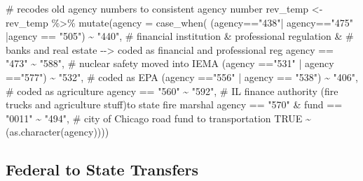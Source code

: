\documentclass[
  letterpaper,
  DIV=11,
  numbers=noendperiod]{scrreport}
\newenvironment{Shaded}{\begin{snugshade}}{\end{snugshade}}
\newcommand{\AttributeTok}[1]{\textcolor[rgb]{0.40,0.45,0.13}{#1}}
\newcommand{\CommentTok}[1]{\textcolor[rgb]{0.37,0.37,0.37}{#1}}
\newcommand{\ConstantTok}[1]{\textcolor[rgb]{0.56,0.35,0.01}{#1}}
\newcommand{\FunctionTok}[1]{\textcolor[rgb]{0.28,0.35,0.67}{#1}}
\newcommand{\NormalTok}[1]{\textcolor[rgb]{0.00,0.23,0.31}{#1}}
\newcommand{\OtherTok}[1]{\textcolor[rgb]{0.00,0.23,0.31}{#1}}
\newcommand{\SpecialCharTok}[1]{\textcolor[rgb]{0.37,0.37,0.37}{#1}}
\newcommand{\StringTok}[1]{\textcolor[rgb]{0.13,0.47,0.30}{#1}}
\begin{document}
\begin{Shaded}
\begin{Highlighting}[]
\CommentTok{\# recodes old agency numbers to consistent agency number}
\NormalTok{rev\_temp }\OtherTok{\textless{}{-}}\NormalTok{ rev\_temp }\SpecialCharTok{\%\textgreater{}\%} 
  \FunctionTok{mutate}\NormalTok{(}\AttributeTok{agency =} \FunctionTok{case\_when}\NormalTok{(}
\NormalTok{    (agency}\SpecialCharTok{==}\StringTok{"438"}\SpecialCharTok{|}\NormalTok{ agency}\SpecialCharTok{==}\StringTok{"475"} \SpecialCharTok{|}\NormalTok{agency }\SpecialCharTok{==} \StringTok{"505"}\NormalTok{) }\SpecialCharTok{\textasciitilde{}} \StringTok{"440"}\NormalTok{,}
    \CommentTok{\# financial institution \&  professional regulation \&}
     \CommentTok{\# banks and real estate  {-}{-}\textgreater{} coded as  financial and professional reg}
\NormalTok{    agency }\SpecialCharTok{==} \StringTok{"473"} \SpecialCharTok{\textasciitilde{}} \StringTok{"588"}\NormalTok{, }\CommentTok{\# nuclear safety moved into IEMA}
\NormalTok{    (agency }\SpecialCharTok{==}\StringTok{"531"} \SpecialCharTok{|}\NormalTok{ agency }\SpecialCharTok{==}\StringTok{"577"}\NormalTok{) }\SpecialCharTok{\textasciitilde{}} \StringTok{"532"}\NormalTok{, }\CommentTok{\# coded as EPA}
\NormalTok{    (agency }\SpecialCharTok{==}\StringTok{"556"} \SpecialCharTok{|}\NormalTok{ agency }\SpecialCharTok{==} \StringTok{"538"}\NormalTok{) }\SpecialCharTok{\textasciitilde{}} \StringTok{"406"}\NormalTok{, }\CommentTok{\# coded as agriculture}
\NormalTok{    agency }\SpecialCharTok{==} \StringTok{"560"} \SpecialCharTok{\textasciitilde{}} \StringTok{"592"}\NormalTok{, }\CommentTok{\# IL finance authority (fire trucks and agriculture stuff)to state fire marshal}
\NormalTok{    agency }\SpecialCharTok{==} \StringTok{"570"} \SpecialCharTok{\&}\NormalTok{ fund }\SpecialCharTok{==} \StringTok{"0011"} \SpecialCharTok{\textasciitilde{}} \StringTok{"494"}\NormalTok{,   }\CommentTok{\# city of Chicago road fund to transportation}
    \ConstantTok{TRUE} \SpecialCharTok{\textasciitilde{}}\NormalTok{ (}\FunctionTok{as.character}\NormalTok{(agency)))) }
\end{Highlighting}
\end{Shaded}

\hypertarget{federal-to-state-transfers}{%
\subsection{Federal to State
Transfers}\label{federal-to-state-transfers}}
\end{document}
